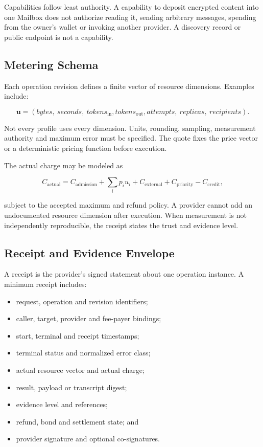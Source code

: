 \documentclass[11pt,oneside]{article}
\begin{document}
Capabilities follow least authority. A capability to deposit encrypted content into one
Mailbox does not authorize reading it, sending arbitrary messages, spending from the owner's
wallet or invoking another provider. A discovery record or public endpoint is not a
capability.

\subsection{Metering Schema}

Each operation revision defines a finite vector of resource dimensions. Examples include:

\[
  \mathbf{u} =
  (bytes,\ seconds,\ tokens_{\mathrm{in}}, tokens_{\mathrm{out}},
   attempts,\ replicas,\ recipients).
\]

Not every profile uses every dimension. Units, rounding, sampling, measurement authority and
maximum error must be specified. The quote fixes the price vector or a deterministic pricing
function before execution.

The actual charge may be modeled as

\[
  C_{\mathrm{actual}} =
  C_{\mathrm{admission}}
  + \sum_i p_i u_i
  + C_{\mathrm{external}}
  + C_{\mathrm{priority}}
  - C_{\mathrm{credit}},
\]

subject to the accepted maximum and refund policy. A provider cannot add an undocumented
resource dimension after execution. When measurement is not independently reproducible, the
receipt states the trust and evidence level.

\subsection{Receipt and Evidence Envelope}

A receipt is the provider's signed statement about one operation instance. A minimum receipt
includes:

\begin{itemize}
  \item request, operation and revision identifiers;
  \item caller, target, provider and fee-payer bindings;
  \item start, terminal and receipt timestamps;
  \item terminal status and normalized error class;
  \item actual resource vector and actual charge;
  \item result, payload or transcript digest;
  \item evidence level and references;
  \item refund, bond and settlement state; and
  \item provider signature and optional co-signatures.
\end{itemize}
\end{document}
